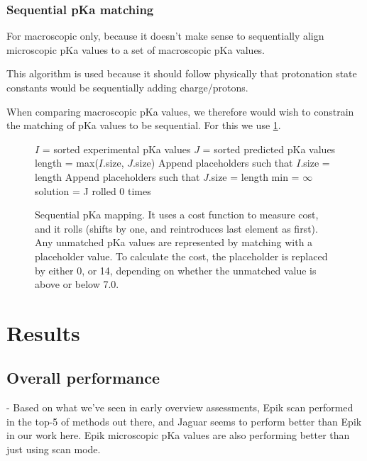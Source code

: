 \documentclass[9pt,lineno,final]{elife}
\begin{document}
\subsubsection{Sequential pKa matching}

For macroscopic only, because it doesn't make sense to sequentially align microscopic pKa values to a set of macroscopic pKa values. 

This algorithm is used because it should follow physically that protonation state constants would be sequentially adding charge/protons.

When comparing macroscopic pKa values, we therefore would wish to constrain the matching of pKa values to be sequential. For this we use \cref{alg:sequential}.

\begin{figure}
	\begin{algorithm}[H]
		\SetAlgoLined
		\caption{Sequential pKa mapping. It uses a cost function to measure cost, and it rolls (shifts by one, and reintroduces last element as first). Any unmatched pKa values are represented by matching with a placeholder value. To calculate the cost, the placeholder is replaced by either 0, or 14, depending on whether the unmatched value is above or below 7.0.}
		\label{alg:sequential}
		 
		$I$ = sorted experimental pKa values \;
		$J$ = sorted predicted pKa values \;
		length = max($I$.size, $J$.size)\;
		Append placeholders such that $I$.size = length \;
		Append placeholders such that $J$.size = length \;
		min = $\infty$\;
		solution = J rolled 0 times\;
	\end{algorithm}
\end{figure}

\section{Results}

\subsection{Overall performance}

- Based on what we've seen in early overview assessments, Epik scan performed in the top-5 of methods out there, and Jaguar seems to perform better than Epik in our work here. Epik microscopic pKa values are also performing better than just using scan mode.
\end{document}
